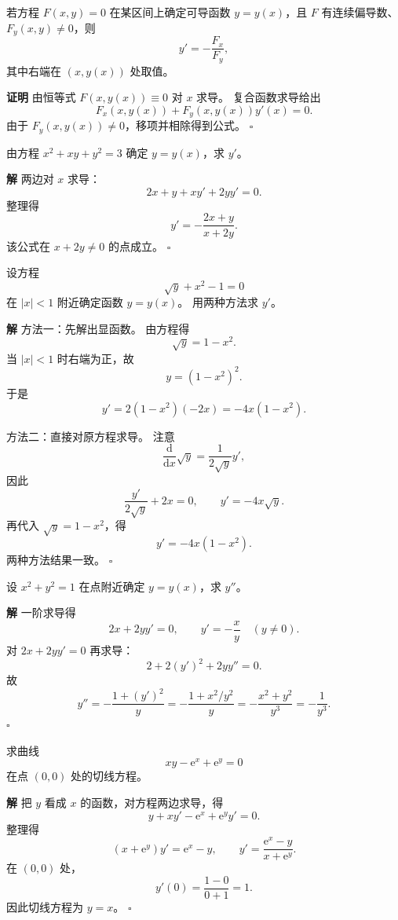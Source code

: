 \documentclass[fontset=fandol]{ctexart}
\newenvironment{proofdetail}{\par\noindent\textbf{证明}\quad}{\hfill$\square$\par\vspace{0.8em}}
\newenvironment{solution}{\par\noindent\textbf{解}\quad}{\hfill$\square$\par\vspace{0.8em}}
\newcommand{\dd}{\mathrm{d}}
\newcommand{\ee}{\mathrm{e}}
\begin{document}
\begin{proposition}[隐函数一阶求导]
	若方程 $F(x,y)=0$ 在某区间上确定可导函数 $y=y(x)$，且 $F$ 有连续偏导数、$F_y(x,y)\neq0$，则
	\[
	y'=-\frac{F_x}{F_y},
	\]
	其中右端在 $(x,y(x))$ 处取值。
\end{proposition}
\begin{proofdetail}
	由恒等式 $F(x,y(x))\equiv0$ 对 $x$ 求导。 复合函数求导给出
	\[
	F_x(x,y(x))+F_y(x,y(x))y'(x)=0.
	\]
	由于 $F_y(x,y(x))\neq0$，移项并相除得到公式。
\end{proofdetail}

\begin{example}[隐函数一阶导数]
	由方程 $x^2+xy+y^2=3$ 确定 $y=y(x)$，求 $y'$。
\end{example}
\begin{solution}
	两边对 $x$ 求导：
	\[
	2x+y+xy'+2yy'=0.
	\]
	整理得
	\[
	y'=-\frac{2x+y}{x+2y}.
	\]
	该公式在 $x+2y\neq0$ 的点成立。
\end{solution}

\begin{example}[先说明隐函数再求导]
	设方程
	\[
	\sqrt{y}+x^2-1=0
	\]
	在 $|x|<1$ 附近确定函数 $y=y(x)$。 用两种方法求 $y'$。
\end{example}
\begin{solution}
	方法一：先解出显函数。 由方程得
	\[
	\sqrt{y}=1-x^2.
	\]
	当 $|x|<1$ 时右端为正，故
	\[
	y=(1-x^2)^2.
	\]
	于是
	\[
	y'=2(1-x^2)(-2x)=-4x(1-x^2).
	\]
	
	方法二：直接对原方程求导。 注意
	\[
	\frac{\dd}{\dd x}\sqrt{y}
	=\frac{1}{2\sqrt{y}}y',
	\]
	因此
	\[
	\frac{y'}{2\sqrt{y}}+2x=0,
	\qquad
	y'=-4x\sqrt{y}.
	\]
	再代入 $\sqrt{y}=1-x^2$，得
	\[
	y'=-4x(1-x^2).
	\]
	两种方法结果一致。
\end{solution}

\begin{example}[隐函数二阶导数]
	设 $x^2+y^2=1$ 在点附近确定 $y=y(x)$，求 $y''$。
\end{example}
\begin{solution}
	一阶求导得
	\[
	2x+2yy'=0,\qquad y'=-\frac{x}{y}\quad(y\neq0).
	\]
	对 $2x+2yy'=0$ 再求导：
	\[
	2+2(y')^2+2yy''=0.
	\]
	故
	\[
	y''=-\frac{1+(y')^2}{y}=-\frac{1+x^2/y^2}{y}
	=-\frac{x^2+y^2}{y^3}=-\frac1{y^3}.
	\]
\end{solution}

\begin{example}[隐函数切线]
	求曲线
	\[
	xy-\ee^x+\ee^y=0
	\]
	在点 $(0,0)$ 处的切线方程。
\end{example}
\begin{solution}
	把 $y$ 看成 $x$ 的函数，对方程两边求导，得
	\[
	y+xy'-\ee^x+\ee^y y'=0.
	\]
	整理得
	\[
	(x+\ee^y)y'=\ee^x-y,\qquad
	y'=\frac{\ee^x-y}{x+\ee^y}.
	\]
	在 $(0,0)$ 处，
	\[
	y'(0)=\frac{1-0}{0+1}=1.
	\]
	因此切线方程为 $y=x$。
\end{solution}
\end{document}
